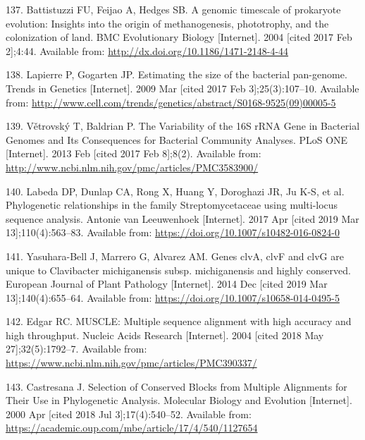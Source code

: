 \documentclass[12pt,twoside]{reedthesis}
\begin{document}
  \hypertarget{ref-battistuzzi_genomic_2004}{}
  137. Battistuzzi FU, Feijao A, Hedges SB. A genomic timescale of
  prokaryote evolution: Insights into the origin of methanogenesis,
  phototrophy, and the colonization of land. BMC Evolutionary Biology
  {[}Internet{]}. 2004 {[}cited 2017 Feb 2{]};4:44. Available from:
  \url{http://dx.doi.org/10.1186/1471-2148-4-44}
  
  \hypertarget{ref-lapierre_estimating_2009}{}
  138. Lapierre P, Gogarten JP. Estimating the size of the bacterial
  pan-genome. Trends in Genetics {[}Internet{]}. 2009 Mar {[}cited 2017
  Feb 3{]};25(3):107--10. Available from:
  \url{http://www.cell.com/trends/genetics/abstract/S0168-9525(09)00005-5}
  
  \hypertarget{ref-vetrovsky_variability_2013}{}
  139. Větrovský T, Baldrian P. The Variability of the 16S rRNA Gene in
  Bacterial Genomes and Its Consequences for Bacterial Community Analyses.
  PLoS ONE {[}Internet{]}. 2013 Feb {[}cited 2017 Feb 8{]};8(2). Available
  from: \url{http://www.ncbi.nlm.nih.gov/pmc/articles/PMC3583900/}
  
  \hypertarget{ref-labeda_phylogenetic_2017}{}
  140. Labeda DP, Dunlap CA, Rong X, Huang Y, Doroghazi JR, Ju K-S, et al.
  Phylogenetic relationships in the family Streptomycetaceae using
  multi-locus sequence analysis. Antonie van Leeuwenhoek {[}Internet{]}.
  2017 Apr {[}cited 2019 Mar 13{]};110(4):563--83. Available from:
  \url{https://doi.org/10.1007/s10482-016-0824-0}
  
  \hypertarget{ref-yasuhara-bell_genes_2014}{}
  141. Yasuhara-Bell J, Marrero G, Alvarez AM. Genes clvA, clvF and clvG
  are unique to Clavibacter michiganensis subsp. michiganensis and highly
  conserved. European Journal of Plant Pathology {[}Internet{]}. 2014 Dec
  {[}cited 2019 Mar 13{]};140(4):655--64. Available from:
  \url{https://doi.org/10.1007/s10658-014-0495-5}
  
  \hypertarget{ref-edgar_muscle_2004}{}
  142. Edgar RC. MUSCLE: Multiple sequence alignment with high accuracy
  and high throughput. Nucleic Acids Research {[}Internet{]}. 2004
  {[}cited 2018 May 27{]};32(5):1792--7. Available from:
  \url{https://www.ncbi.nlm.nih.gov/pmc/articles/PMC390337/}
  
  \hypertarget{ref-castresana_selection_2000}{}
  143. Castresana J. Selection of Conserved Blocks from Multiple
  Alignments for Their Use in Phylogenetic Analysis. Molecular Biology and
  Evolution {[}Internet{]}. 2000 Apr {[}cited 2018 Jul 3{]};17(4):540--52.
  Available from:
  \url{https://academic.oup.com/mbe/article/17/4/540/1127654}
  
\end{document}
